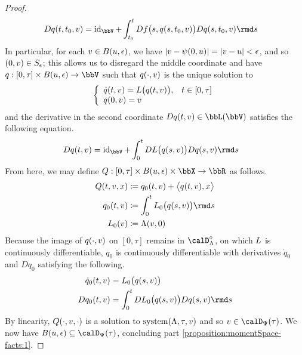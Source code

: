 \begin{proof}
\begin{align*}
    D q(t,t_0,\vecVar) 
    &= \operatorname{id}_\vecSpace + \int_{t_0}^t Df\big(s, q(s,t_0,\vecVar) \big) Dq(s, t_0, \vecVar) \rmd s
  \end{align*}
  In particular, for each $v \in B(u, \epsilon)$, we have $|v - \psi(0,u)| = |v - u| < \epsilon$, and so $(0,v) \in S_\epsilon$; this allows us to disregard the middle coordinate and have $q: [0,\tau] \times B(\momentVar,\epsilon) \rightarrow \vecSpace$ such that $q(\cdot,v)$ is the unique solution to 
  \begin{equation*}
    \left\{\begin{array}{ll}
      \dot q(t, v) = L\big(q(t, v)\big), & t \in [0,\tau] \\
      q(0, v) = v
    \end{array}\right.
  \end{equation*}
  and the derivative in the second coordinate $Dq(t,\vecVar) \in \bbL(\vecSpace)$ satisfies the following equation.
  \begin{align*}
    D q(t,\vecVar) &= \operatorname{id}_\vecSpace + \int_0^t D\odePart\big(q(s,\vecVar)\big)Dq(s, \vecVar) \rmd s
  \end{align*}
  From here, we may define $Q: [0,\tau] \times B(\momentVar,\epsilon) \times \stateSpace \rightarrow \bbR$ as follows.
  \begin{align*}
    Q(t,\vecVar,\stateVar) &\defeq q_0(t,\vecVar) + \bprj{q(t,\vecVar)}{\stateVar} \\
    q_0(t,\vecVar) &\defeq \int_0^t \odePart_0\big(q(s,\vecVar)\big) \rmd s \\
    \odePart_0(\vecVar) &\defeq \ode(\vecVar, 0)
  \end{align*}
  Because the image of $q(\cdot, v)$ on $[0,\tau]$ remains in $\odeSpace^\circ$, on which $L$ is continuously differentiable, $q_0$ is continuously differentiable with derivatives $\dot q_0$ and $D q_0$ satisfying the following.
  \begin{align*}
    \dot q_0(t,\vecVar) &= \odePart_0\big(q(s,\vecVar)\big) \\
    D q_0(t, \vecVar) &= \int_0^t D\odePart_0\big( q(s, \vecVar) \big) Dq(s, \vecVar) \rmd s
  \end{align*}
  By linearity, $Q(\cdot,v,\cdot)$ is a solution to $\operatorname{system}(\Lambda, \tau, v)$ and so $\vecVar \in \momentSpace(\tau)$.
  We now have $B(\momentVar,\epsilon) \subseteq \momentSpace(\tau)$, concluding part \ref{proposition:momentSpace-facts:1}.

\end{proof}
